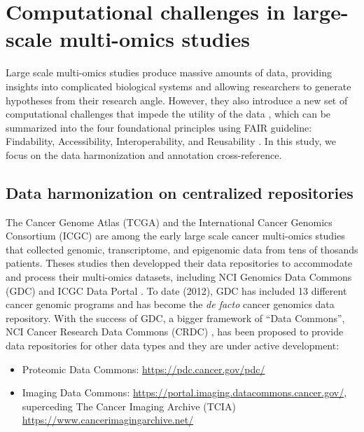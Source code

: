 


\section{Computational challenges in large-scale multi-omics studies}
Large scale multi-omics studies produce massive amounts of data, providing insights into complicated biological systems and allowing researchers to generate hypotheses from their research angle. However, they also introduce a new set of computational challenges that impede the utility of the data \cite{marxv_marxv:DrillingBig2013,deanda-jaureguig_hernandez-lemuse:ComputationalOncology2020}, which can be summarized into the four foundational principles using FAIR guideline: Findability, Accessibility, Interoperability, and Reusability \cite{wilkinsonmd_monsb:FAIRGuiding2016}. In this study, we focus on the data harmonization and annotation cross-reference.


\subsection{Data harmonization on centralized repositories}
The Cancer Genome Atlas (TCGA) \cite{hutterc_zenklusenjc:CancerGenome2018} and the International Cancer Genomics Consortium (ICGC) \cite{internationalcancergenomeconsortium_yangh:InternationalNetwork2010} are among the early large scale cancer multi-omics studies that collected genomic, transcriptome, and epigenomic data from tens of thosands patients. Theses studies then developped their data repositories to accommodate and process their multi-omics datasets, including NCI Genomics Data Commons (GDC)\footnotemark{} \cite{heathap_grossmanrl:NCIGenomic2021} and ICGC Data Portal \cite{jolyy_chalmersd:DataSharing2012}. To date (2012), GDC has included 13 different cancer genomic programs and has become the \textit{de facto} cancer genomics data repository. With the success of GDC, a bigger framework of ``Data Commons'', NCI Cancer Research Data Commons (CRDC) \cite{hinksoniv_kibbewa:ComprehensiveInfrastructure2017}, has been proposed to provide data repositories for other data types and they are under active development:
\begin{itemize}
    \item Proteomic Data Commons: \url{https://pdc.cancer.gov/pdc/}
    \item Imaging Data Commons: \url{https://portal.imaging.datacommons.cancer.gov/}, superceding The Cancer Imaging Archive (TCIA) \url{https://www.cancerimagingarchive.net/}
\end{itemize}

